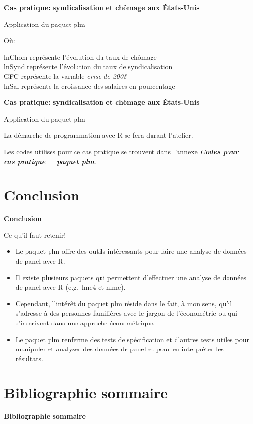 \documentclass{beamer}
\begin{document}
\begin{frame}{\textbf{Cas pratique: syndicalisation et ch\^omage aux \'Etats-Unis}}
\begin{block}{Application du paquet plm}
\end{block}
O\`u: 
\begin{description} 
 \item[lnChom repr\'esente l'\'evolution du taux de ch\^omage]
 \item[lnSynd repr\'esente l'\'evolution du taux de syndicalisation]
 \item[GFC repr\'esente la variable \textit{crise de 2008}]  
 \item[lnSal repr\'esente la croissance des salaires en pourcentage]
\end{description} 
\end{frame}
\begin{frame}{\textbf{Cas pratique: syndicalisation et ch\^omage aux \'Etats-Unis}}
\begin{block}{Application du paquet plm}
\end{block}
La d\'emarche de programmation avec R se fera durant l'atelier. \newline

Les codes utilis\'es pour ce cas pratique se trouvent dans l'annexe \textbf{\textit{Codes pour cas pratique \_ paquet plm}}. 
\end{frame}
\section{\textbf{Conclusion}}
\begin{frame}{\textbf{Conclusion}}
\begin{block}{Ce qu'il faut retenir!}
\end{block}
\begin{itemize}
\item Le paquet plm offre des outils int\'eressants pour faire une analyse de donn\'ees de panel avec R. 
\item Il existe plusieurs paquets qui permettent d'effectuer une analyse de donn\'ees de panel avec R (e.g.\ lme4 et nlme).
\item Cependant, l'int\'er\^et du paquet plm r\'eside dans le fait, \`a mon sens, qu'il s'adresse \`a des personnes famili\`eres avec le jargon de l'\'econom\'etrie ou qui s'inscrivent dans une approche \'econom\'etrique. 
\item Le paquet plm renferme des tests de sp\'ecification et d'autres tests utiles pour manipuler et analyser des donn\'ees de panel et pour en interpr\'eter les r\'esultats. 
\end{itemize}
\end{frame}
\section{\textbf{Bibliographie sommaire}}
\begin{frame}{\textbf{Bibliographie sommaire}}
\nocite{*} %
\printbibliography 
\end{frame}
\end{document}
